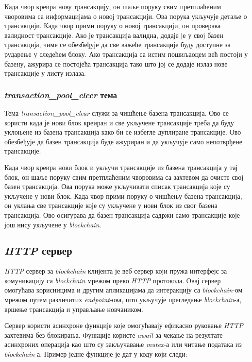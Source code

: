 \documentclass[12pt, a4paper]{article}
\begin{document}
Када чвор креира нову трансакцију, он шаље поруку свим претплаћеним чворовима са информацијама о новој трансакцији. Ова порука укључује детаље о трансакцији. Када чвор прими поруку о новој трансакцији, он проверава валидност трансакције. Ако је трансакција валидна, додаје је у свој базен трансакција, чиме се обезбеђује да све важеће трансакције буду доступне за рударење у следећем блоку. Ако трансакција са истим пошиљаоцем већ постоји у базену, ажурира се постојећа трансакција тако што јој се додаје излаз нове трансакције у листу излаза.


\subsubsection{\textbf{\textit{transaction\_pool\_cleer}} тема}
Тема \textit{transaction\_pool\_clear} служи за чишћење базена трансакција. Ово се користи када је нови блок креиран и све укључене трансакције треба да буду уклоњене из базена трансакција како би се избегле дуплиране трансакције. Ово обезбеђује да базен трансакција буде ажуриран и да укључује само непотврђене трансакције.

Када чвор креира нови блок и укључи трансакције из базена трансакција у тај блок, он шаље поруку свим претплаћеним чворовима са захтевом да очисте свој базен трансакција. Ова порука може укључивати списак трансакција које су укључене у нови блок.
Када чвор прими поруку о чишћењу базена трансакција, он уклања све трансакције које су укључене у нови блок из свог базена трансакција. Ово осигурава да базен трансакција садржи само трансакције које још нису укључене у \textit{blockchain}.
\newpage
\subsection{\textit{HTTP} сервер}
\textit{HTTP} сервер за \textit{blockchain} клијента је веб сервер који пружа интерфејс за комуникацију са \textit{blockchain} мрежом преко \textit{HTTP} протокола. Овај сервер омогућава корисницима и другим апликацијама да интеракцију са \textit{blockchain}-ом мрежом путем различитих \textit{endpoint}-ова, што укључује прегледање \textit{blockchain}-а, вршење трансакција и управљање новчаником.

Сервер користи асинхроне функције које омогућавају ефикасно руковање \textit{HTTP} захтевима без блокирања. Функције користе \textit{await} за чекање на резултате асинхроних операција као што су закључавање \textit{mutex}-а или читање података из \textit{blockchain}-а. Пример једне функције је дат у коду који следи:
\end{document}
